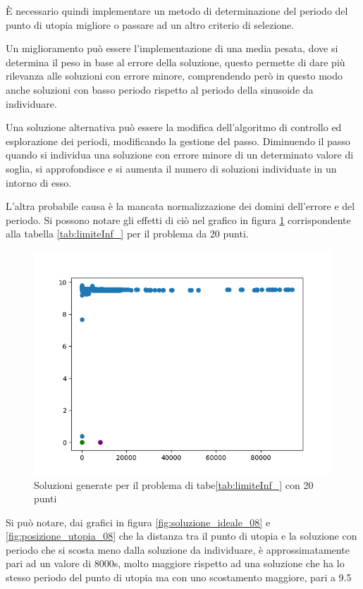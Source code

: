 \documentclass[a4paper,12pt]{report}
\begin{document}
È necessario quindi implementare un metodo di determinazione del periodo del punto di utopia migliore o passare ad un altro criterio di selezione.

Un miglioramento può essere l'implementazione di una media pesata, dove si determina il peso in base al errore della soluzione, questo permette di dare più rilevanza alle soluzioni con errore minore, comprendendo però in questo modo anche soluzioni con basso periodo rispetto al periodo della sinusoide da individuare.

Una soluzione alternativa può essere la modifica dell'algoritmo di controllo ed esplorazione dei periodi, modificando la gestione del passo. Diminuendo il passo quando si individua una soluzione con errore minore di un determinato valore di soglia, si approfondisce e si aumenta il numero di soluzioni individuate in un intorno di esso.

L'altra probabile causa è la mancata normalizzazione dei domini dell'errore e del periodo. Si possono notare gli effetti di ciò nel grafico in figura \ref{fig:tutte_le_soluzioni_08} corrispondente alla tabella \ref{tab:limiteInf_} per il problema da 20 punti.

\begin{figure}
  \center
  \includegraphics[scale=0.80]{img/puls08/tutte_le_soluzioni.png}
  \caption{Soluzioni generate per il problema di tabe\ref{tab:limiteInf_} con 20 punti}
  \label{fig:tutte_le_soluzioni_08}
\end{figure}

Si può notare, dai grafici in figura \ref{fig:soluzione_ideale_08} e \ref{fig:posizione_utopia_08} che la distanza tra il punto di utopia e la soluzione con periodo che si scosta meno dalla soluzione da individuare, è approssimatamente pari ad un valore di 8000s, molto maggiore rispetto ad una soluzione che ha lo stesso periodo del punto di utopia ma con uno scostamento maggiore, pari a 9.5
\end{document}

